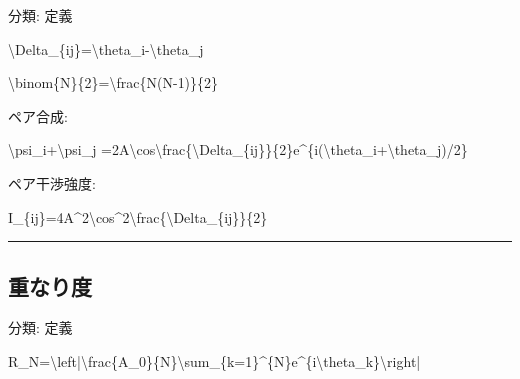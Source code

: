 \documentclass[
  a4paper,
]{ltjsarticle}
\newenvironment{Shaded}{}{}
\newcommand{\NormalTok}[1]{#1}
\begin{document}
分類: 定義

\begin{Shaded}
\begin{Highlighting}[]
\NormalTok{\textbackslash{}Delta\_\{ij\}=\textbackslash{}theta\_i{-}\textbackslash{}theta\_j}
\end{Highlighting}
\end{Shaded}

\begin{Shaded}
\begin{Highlighting}[]
\NormalTok{\textbackslash{}binom\{N\}\{2\}=\textbackslash{}frac\{N(N{-}1)\}\{2\}}
\end{Highlighting}
\end{Shaded}

ペア合成:

\begin{Shaded}
\begin{Highlighting}[]
\NormalTok{\textbackslash{}psi\_i+\textbackslash{}psi\_j}
\NormalTok{=2A\textbackslash{}cos\textbackslash{}frac\{\textbackslash{}Delta\_\{ij\}\}\{2\}e\^{}\{i(\textbackslash{}theta\_i+\textbackslash{}theta\_j)/2\}}
\end{Highlighting}
\end{Shaded}

ペア干渉強度:

\begin{Shaded}
\begin{Highlighting}[]
\NormalTok{I\_\{ij\}=4A\^{}2\textbackslash{}cos\^{}2\textbackslash{}frac\{\textbackslash{}Delta\_\{ij\}\}\{2\}}
\end{Highlighting}
\end{Shaded}

\begin{center}\rule{0.5\linewidth}{0.5pt}\end{center}

\subsection{重なり度}\label{ux91cdux306aux308aux5ea6}

分類: 定義

\begin{Shaded}
\begin{Highlighting}[]
\NormalTok{R\_N=\textbackslash{}left|\textbackslash{}frac\{A\_0\}\{N\}\textbackslash{}sum\_\{k=1\}\^{}\{N\}e\^{}\{i\textbackslash{}theta\_k\}\textbackslash{}right|}
\end{Highlighting}
\end{Shaded}
\end{document}
